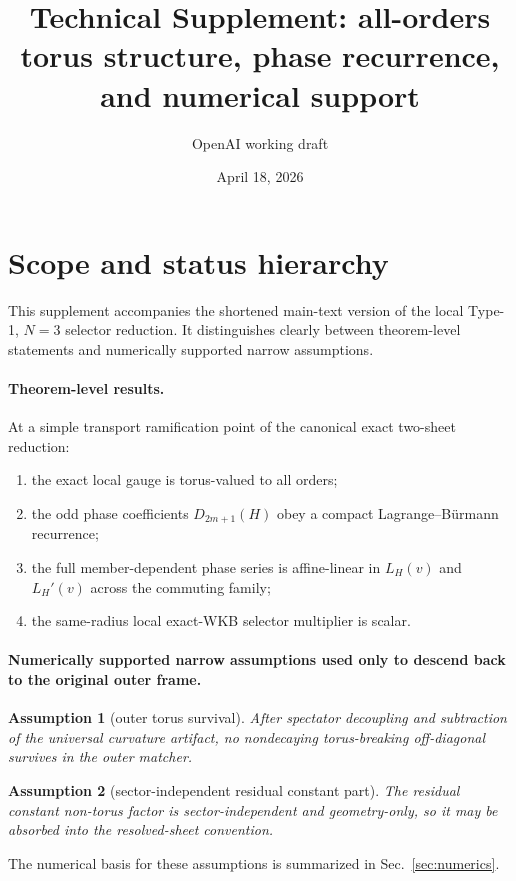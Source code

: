 \documentclass[11pt]{article}
\newtheorem{assumption}{Assumption}
\newcommand{\LH}{L_H}
\begin{document}
\title{Technical Supplement: all-orders torus structure, phase recurrence, and numerical support}
\author{OpenAI working draft}
\date{April 18, 2026}
\maketitle

\section{Scope and status hierarchy}
This supplement accompanies the shortened main-text version of the local Type-1, $N=3$ selector reduction. It distinguishes clearly between theorem-level statements and numerically supported narrow assumptions.

\paragraph*{Theorem-level results.}
At a simple transport ramification point of the canonical exact two-sheet reduction:
\begin{enumerate}[leftmargin=2em,itemsep=2pt]
\item the exact local gauge is torus-valued to all orders;
\item the odd phase coefficients $D_{2m+1}(H)$ obey a compact Lagrange--B\"urmann recurrence;
\item the full member-dependent phase series is affine-linear in $\LH(v)$ and $\LH'(v)$ across the commuting family;
\item the same-radius local exact-WKB selector multiplier is scalar.
\end{enumerate}

\paragraph*{Numerically supported narrow assumptions used only to descend back to the original outer frame.}
\begin{assumption}[outer torus survival]
After spectator decoupling and subtraction of the universal curvature artifact, no nondecaying torus-breaking off-diagonal survives in the outer matcher.
\end{assumption}
\begin{assumption}[sector-independent residual constant part]
The residual constant non-torus factor is sector-independent and geometry-only, so it may be absorbed into the resolved-sheet convention.
\end{assumption}
The numerical basis for these assumptions is summarized in Sec.~\ref{sec:numerics}.
\end{document}
